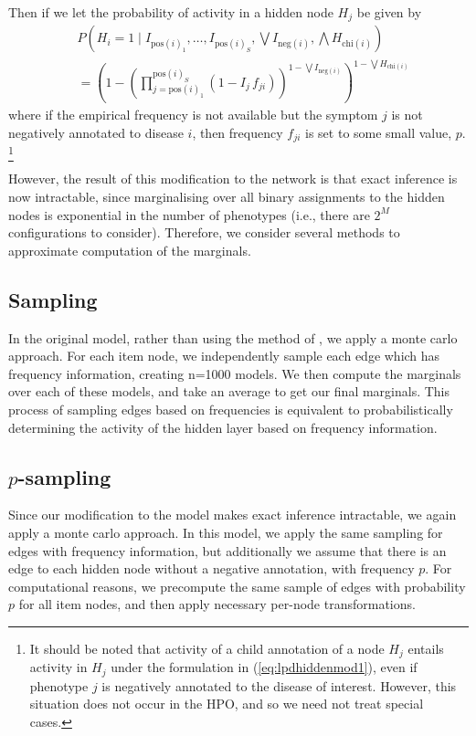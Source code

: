 Then if we let the probability of activity in a hidden node $H_j$ be given by
\begin{align}\label{eq:lpdhiddenmod1}
    &P\left(H_i = 1 \mid I_{\text{pos}(i)_1}, \hdots, I_{\text{pos}(i)_S},
    \bigvee I_{\text{neg}(i)}, \bigwedge H_{\text{chi}(i)}\right)\nonumber\\
        &= \left(
            1 - 
            \left(
                \prod_{j=\text{pos}(i)_1}^{\text{pos}(i)_S}
                \left(1 - I_j \, f_{ji}\right)
            \right) ^{1 - \bigvee I_{\text{neg}(i)}}
        \right)
        ^{1 - \bigvee H_{\text{chi}(i)}}
\end{align}
where if the empirical frequency is not available but the symptom $j$ is not
negatively annotated to disease $i$, then frequency $f_{ji}$ is set to some
small value, $p$.
%
\footnote{It should be noted that activity of a child annotation of a node
    $H_j$ entails activity in $H_j$ under the formulation in
    (\ref{eq:lpdhiddenmod1}), even if phenotype $j$ is negatively annotated
    to the disease of interest. However, this situation does not occur in the
    HPO, and so we need not treat special cases.
}
%

However, the result of this modification to the network is that exact inference
is now intractable, since marginalising over all binary assignments to the
hidden nodes is exponential in the number of phenotypes (i.e., there are $2^M$
configurations to consider). Therefore, we consider several methods to
approximate computation of the marginals.

\subsection{Sampling}
In the original model, rather than using the method of , we
apply a monte carlo approach. For each item node, we independently sample each edge
which has frequency information, creating n=1000 models. We then compute the marginals
over each of these models, and take an average to get our final marginals. This process
of sampling edges based on frequencies is equivalent to probabilistically determining
the activity of the hidden layer based on frequency information.
\subsection{$p$-sampling}
Since our modification to the model makes exact inference intractable, we again apply
a monte carlo approach. In this model, we apply the same sampling for edges with frequency
information, but additionally we assume that there is an edge to each hidden node without
a negative annotation, with frequency $p$. For computational reasons, we precompute the
same sample of edges with probability $p$ for all item nodes, and then apply necessary per-node
transformations.
